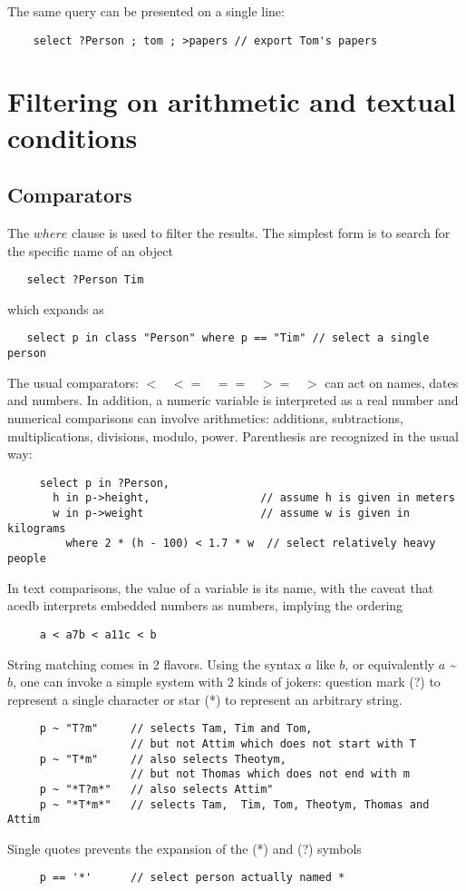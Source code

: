 \documentclass[11pt]{article}
\newcommand{\BL}{\begin{lstlisting}}
\begin{document}
The same query can be presented on a single line:
\BL
    select ?Person ; tom ; >papers // export Tom's papers
\end{lstlisting}


\section{Filtering on arithmetic and textual conditions}
\subsection{Comparators}

The $where$ clause is used to filter the results. The simplest form is to search for the specific name of an object
\BL
   select ?Person Tim
\end{lstlisting}
which expands as
\BL
   select p in class "Person" where p == "Tim" // select a single person
\end{lstlisting}

The usual comparators: 
$< \;\;\; <= \;\;\;  ==  \;\;\; >=  \;\;\; >$
can act on names, dates and numbers. In addition, a numeric variable is interpreted as a real number  
and numerical comparisons can involve arithmetics: additions, subtractions, multiplications, divisions, 
modulo, power.  Parenthesis are recognized in the usual way:
\BL
     select p in ?Person, 
       h in p->height,                 // assume h is given in meters
       w in p->weight                  // assume w is given in kilograms
         where 2 * (h - 100) < 1.7 * w  // select relatively heavy people
\end{lstlisting}

In text comparisons, the value of a variable is its name, with the caveat that acedb interprets 
embedded numbers as numbers, implying the ordering
\BL
     a < a7b < a11c < b
\end{lstlisting}

String matching comes in 2 flavors. Using the syntax $a$ like $b$, or equivalently
$a$ \~{} $b$, one can invoke a simple system 
with 2 kinds of jokers: 
question mark (?) to represent a single character or star (*) to represent an arbitrary string. 
\BL
     p ~ "T?m"     // selects Tam, Tim and Tom, 
                   // but not Attim which does not start with T
     p ~ "T*m"     // also selects Theotym, 
                   // but not Thomas which does not end with m
     p ~ "*T?m*"   // also selects Attim"
     p ~ "*T*m*"   // selects Tam,  Tim, Tom, Theotym, Thomas and  Attim
\end{lstlisting}
Single quotes prevents the expansion of the (*) and (?) symbols
\BL
     p == '*'      // select person actually named *
\end{lstlisting}
\end{document}
